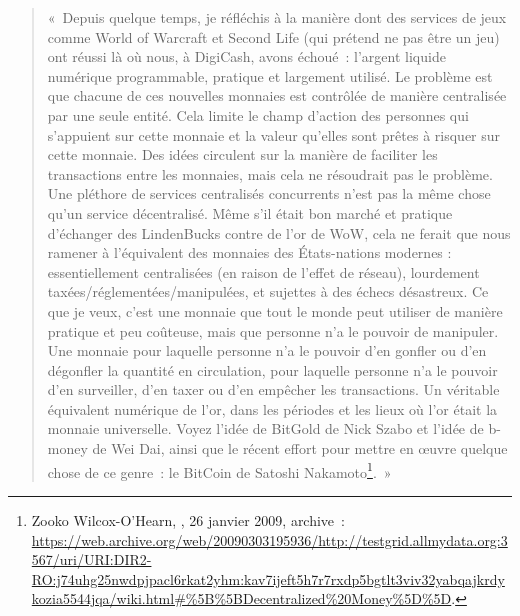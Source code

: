 \begin{quote}
«~Depuis quelque temps, je réfléchis à la manière dont des services de jeux comme World of Warcraft et Second Life (qui prétend ne pas être un jeu) ont réussi là où nous, à DigiCash, avons échoué~: l'argent liquide numérique programmable, pratique et largement utilisé. Le problème est que chacune de ces nouvelles monnaies est contrôlée de manière centralisée par une seule entité. Cela limite le champ d'action des personnes qui s'appuient sur cette monnaie et la valeur qu'elles sont prêtes à risquer sur cette monnaie. Des idées circulent sur la manière de faciliter les transactions entre les monnaies, mais cela ne résoudrait pas le problème. Une pléthore de services centralisés concurrents n'est pas la même chose qu'un service décentralisé. Même s'il était bon marché et pratique d'échanger des LindenBucks contre de l'or de WoW, cela ne ferait que nous ramener à l'équivalent des monnaies des États-nations modernes : essentiellement centralisées (en raison de l'effet de réseau), lourdement taxées/réglementées/manipulées, et sujettes à des échecs désastreux. Ce que je veux, c'est une monnaie que tout le monde peut utiliser de manière pratique et peu coûteuse, mais que personne n'a le pouvoir de manipuler. Une monnaie pour laquelle personne n'a le pouvoir d'en gonfler ou d'en dégonfler la quantité en circulation, pour laquelle personne n'a le pouvoir d'en surveiller, d'en taxer ou d'en empêcher les transactions. Un véritable équivalent numérique de l'or, dans les périodes et les lieux où l'or était la monnaie universelle. Voyez l'idée de BitGold de Nick Szabo et l'idée de b-money de Wei Dai, ainsi que le récent effort pour mettre en œuvre quelque chose de ce genre~: le BitCoin de Satoshi Nakamoto\footnote{Zooko Wilcox-O'Hearn, , 26 janvier 2009, archive~: \url{https://web.archive.org/web/20090303195936/http://testgrid.allmydata.org:3567/uri/URI:DIR2-RO:j74uhg25nwdpjpacl6rkat2yhm:kav7ijeft5h7r7rxdp5bgtlt3viv32yabqajkrdykozia5544jqa/wiki.html\#\%5B\%5BDecentralized\%20Money\%5D\%5D}.}.~»

\end{quote}
